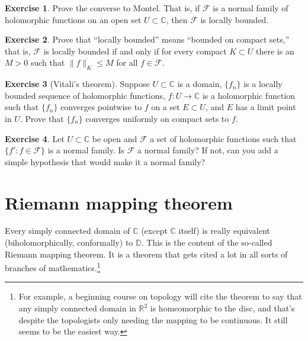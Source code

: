 \documentclass[12pt,openany]{book}
\newcommand{\snorm}[1]{\lVert {#1} \rVert}
\newcommand{\C}{{\mathbb{C}}}
\newcommand{\R}{{\mathbb{R}}}
\newcommand{\D}{{\mathbb{D}}}
\newcommand{\sF}{{\mathscr{F}}}
\theoremstyle{plain}
\theoremstyle{remark}
\theoremstyle{definition}
\newenvironment{exbox}{%
    \def\FrameCommand{\vrule width 1pt \relax\hspace {10pt}}%
    \MakeFramed {\advance \hsize -\width \FrameRestore }%
}{%
    \endMakeFramed
}
\theoremstyle{exercise}
\newtheorem{exercise}{Exercise}[section]
\theoremstyle{example}
\begin{document}
\begin{exbox}
\begin{exercise}
Prove the converse to Montel.  That is, if $\sF$ is a normal family of 
holomorphic functions on an open set $U \subset \C$, then $\sF$ is locally
bounded.
\end{exercise}

\begin{exercise}
Prove that ``locally bounded'' means ``bounded on compact sets,''
that is, $\sF$ is locally bounded if and only if
for every compact $K \subset U$ there is an $M >0$ such that
$\snorm{f}_K \leq M$ for all $f \in \sF$.
\end{exercise}

\begin{exercise}[Vitali's theorem]
Suppose $U \subset \C$ is a domain, $\{ f_n \}$ is a locally bounded
sequence of holomorphic functions, $f \colon U \to \C$ is a holomorphic
function such that $\{ f_n \}$ converges pointwise to $f$ on a set $E \subset U$,
and $E$ has a limit point in $U$.  Prove that $\{ f_n \}$
converges uniformly on compact sets to $f$.
\end{exercise}

\begin{exercise}
Let $U \subset \C$ be open and $\sF$ a set of holomorphic
functions such that $\{ f' : f \in \sF \}$ is a normal family.
Is $\sF$ a normal family?  If not, can you add a simple
hypothesis that would make it a normal family?
\end{exercise}
\end{exbox}


\section{Riemann mapping theorem}
\label{sec:RMT}

Every simply connected domain of $\C$ (except $\C$ itself) is really
equivalent (biholomorphically, conformally) to $\D$.
This is the content of the so-called Riemann mapping theorem.
It is a theorem that gets cited a lot in all sorts of branches of
mathematics.\footnote{For example, a beginning course on topology will cite
the theorem to say that any simply connected domain in $\R^2$
is homeomorphic to the disc, and that's despite the topologists only
needing the mapping to be continuous.  It still seems to be the easiest way.}
\end{document}
